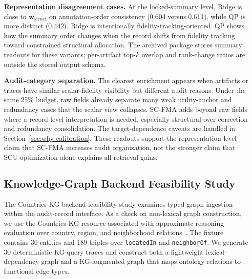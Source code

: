 \documentclass[pdflatex,sn-mathphys-num,iicol]{sn-jnl}
\newcommand{\wstruct}{\ensuremath{\mathbf{w}_{\mathrm{struct}}}}
\begin{document}
\textbf{Representation disagreement cases.} At the locked-summary level, Ridge is close to \wstruct{} on annotation-order consistency (0.604 versus 0.611), while QP is more distinct (0.442). Ridge is intentionally fidelity-tracking-oriented. QP shows how the summary order changes when the record shifts from fidelity tracking toward constrained structural allocation. The archived package stores summary readouts for these variants; per-artifact top-$k$ overlap and rank-change ratios are outside the stored output schema.

\textbf{Audit-category separation.} The clearest enrichment appears when artifacts or traces have similar scalar-fidelity visibility but different audit reasons. Under the same 25\% budget, raw fields already separate many weak utility-anchor and redundancy cases that the scalar view collapses. SC-FMA adds beyond raw fields where a record-level interpretation is needed, especially structural over-correction and redundancy consolidation. The target-dependence caveats are handled in Section~\ref{sec:why-calibration}. These readouts support the representation-level claim that SC-FMA increases audit organization, not the stronger claim that SCU optimization alone explains all retrieval gains.

\subsection{Knowledge-Graph Backend Feasibility Study}
\label{sec:kg-pilot}

The Countries-KG backend feasibility study examines typed graph ingestion within the audit-record interface. As a check on non-lexical graph construction, we use the Countries KG resource associated with approximate-reasoning evaluation over country, region, and neighborhood relations~\cite{bouchard2015approximate}. The fixture contains 30 entities and 189 triples over \texttt{locatedIn} and \texttt{neighborOf}. We generate 30 deterministic KG-query traces and construct both a lightweight lexical-dependency graph and a KG-augmented graph that maps ontology relations to functional edge types.
\end{document}
